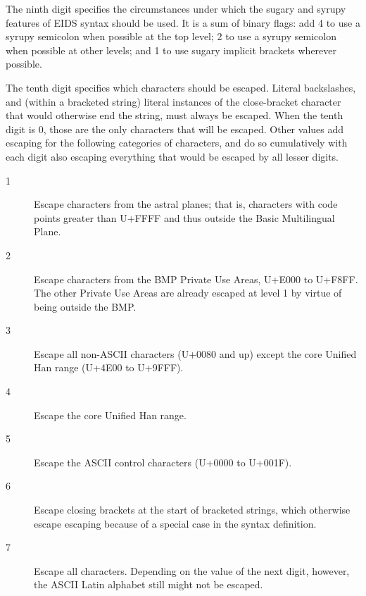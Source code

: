\documentclass[twocolumn]{report}
\begin{document}
The ninth digit specifies the circumstances under which the sugary and
syrupy features of EIDS syntax should be used.  It is a sum of binary flags:
add 4 to use a syrupy semicolon when possible at the top level;
2 to use a syrupy semicolon when possible at other levels;
and 1 to use sugary implicit brackets wherever possible.

The tenth digit specifies which characters should be escaped.  Literal
backslashes, and (within a bracketed string) literal instances of the
close-bracket character that would otherwise end the string, must
always be escaped. 
When the tenth digit is 0, those are the only characters that will be escaped. 
Other values add escaping for the following categories of characters, and do
so cumulatively with each digit also escaping everything that would be
escaped by all lesser digits.
\begin{description}
  \item[1] Escape characters from the astral planes; that is,
    characters with code points greater than U+FFFF and thus outside the
    Basic Multilingual Plane.
  \item[2] Escape characters from the BMP Private Use Areas, U+E000 to
    U+F8FF.  The other Private Use Areas are already escaped at level 1
    by virtue of being outside the BMP.
  \item[3] Escape all non-ASCII characters (U+0080 and up) except the core
    Unified Han range (U+4E00 to U+9FFF).
  \item[4] Escape the core Unified Han range.
  \item[5] Escape the ASCII control characters (U+0000 to U+001F).
  \item[6] Escape closing brackets at the start of bracketed strings, which
    otherwise escape escaping because of a special case in
    the syntax definition.
  \item[7] Escape all characters.  Depending on the value of the next digit,
    however, the ASCII Latin alphabet still might not be escaped.
\end{description}
\end{document}
